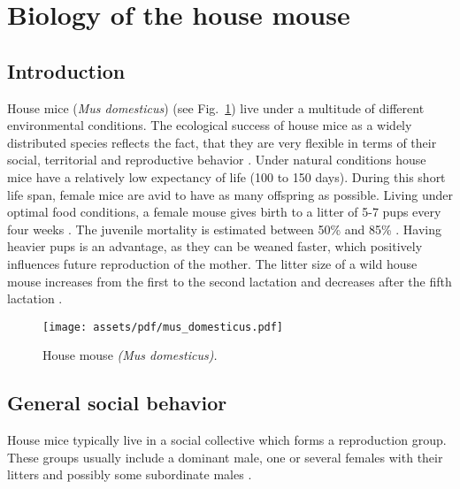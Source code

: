 \newpage
\section{Biology of the house mouse}
\label{sec:biolhousemice}

\subsection{Introduction}
\label{subsec:introduction}

House mice (\textit{Mus domesticus}) (see Fig.~\ref{fig:housemice}) live under a multitude of different environmental conditions. The ecological success of house mice as a widely distributed species reflects the fact, that they are very flexible in terms of their social, territorial and reproductive behavior \citep{bronson:79, bronson:84, berry:81}. Under natural conditions house mice have a relatively low expectancy of life (100 to 150 days). During this short life span, female mice are avid to have as many offspring as possible. Living under optimal food conditions, a female mouse gives birth to a litter of 5-7 pups every four weeks \citep{berry:71, pelikan:81}. The juvenile mortality is estimated between 50\% and 85\% \citep{berry:71, berry:75, pennycuik:86}. Having heavier pups is an advantage, as they can be weaned faster, which positively influences future reproduction of the mother\citep{fuchs:82}. The litter size of a wild house mouse increases from the first to the second lactation and decreases after the fifth lactation \citep{pelikan:81, koenig:87b}. 

\begin{figure}[htbp]	
\centering	
\texttt{[image: assets/pdf/mus\_domesticus.pdf]}	
\caption[House mouse]{House mouse \textit{(Mus domesticus).}}
\label{fig:housemice}
\end{figure}

\subsection{General social behavior}
\label{subsec:socialbehaviour}
House mice typically live in a social collective which forms a reproduction group. These groups usually include a dominant male, one or several females with their litters and possibly some subordinate males \citep{crowcroft:63, reimer:67, selander:70, mackintosh:81}.

